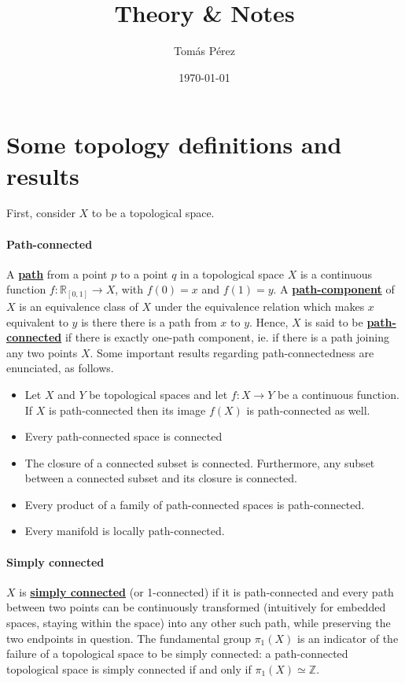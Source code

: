 \documentclass{homework}
\author{Tomás Pérez}
\date{\today}
\title{Theory \& Notes}
\begin{document}
 \maketitle


\section{Some topology definitions and results}

First, consider $X$ to be a topological space.\\

\paragraph{\textbf{Path-connected}}

A \textbf{\underline{path}} from a point $p$ to a point $q$ in a topological space $X$ is a continuous function $f: \mathds{R}_{[0,1]} \to X$, with $f(0) = x$ and $f(1) = y$. A \textbf{\underline{path-component}} of $X$ is an equivalence class of $X$ under the equivalence relation which makes $x$ equivalent to $y$ is there there is a path from $x$ to $y$. Hence, $X$ is said to be \textbf{\underline{path-connected}} if there is exactly one-path component, ie. if there is a path joining any two points $X$. Some important results regarding path-connectedness are enunciated, as follows.

\begin{itemize}
    \item Let $X$ and $Y$ be topological spaces and let $f: X \to Y$ be a continuous function. If $X$ is path-connected then its image $f(X)$ is path-connected as well. 
    \item Every path-connected space is connected
    \item The closure of a connected subset is connected. Furthermore, any subset between a connected subset and its closure is connected. 
    \item Every product of a family of path-connected  spaces is path-connected.
    \item Every manifold is locally path-connected. \\
\end{itemize}

\paragraph{\textbf{Simply connected}}

$X$ is \textbf{\underline{simply connected}} (or 1-connected) if it is path-connected and every path between two points can be continuously transformed (intuitively for embedded spaces, staying within the space) into any other such path, while preserving the two endpoints in question. The fundamental group $\pi_1(X)$ is an indicator of the failure of a topological space to be simply connected: a path-connected topological space is simply connected if and only if $\pi_1(X) \simeq \mathds{Z}$. \\
\end{document}
